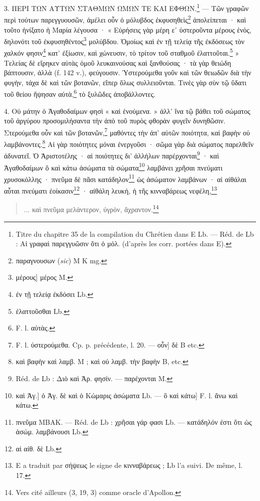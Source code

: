 \documentclass[landscape, a4paper, 11pt, oneside, polutonikogreek, french]{article}
\begin{document}
3. ΠΕΡΙ ΤΩΝ ΑΥΤΩΝ ΣΤΑΘΜΩΝ ΩΜΩΝ ΤΕ ΚΑΙ ΕΦΘΩΝ.\footnote{Titre du chapitre 35 de la compilation du Chrétien dans E Lb. --- Réd. de Lb : Αἱ γραφαὶ παρεγγυῶσιν ὅτι ὁ μόλ. (d'après les corr. portées dans E).} --- Τῶν γραφῶν περὶ τούτων παρεγγυουσῶν, ἀμέλει οὖν ὁ μόλυβδος ἐκφυσηθεὶς\footnote{παραγνουσων (\emph{sic}) M K mg.} ἀπολείπεται · καὶ τοῦτο ἠνίξατο ἡ Μαρία λέγουσα · « Εὑρήσεις γὰρ μέρη εʹ ὑστεροῦντα μέρους ἑνὸς, δηλονότι τοῦ ἐκφυσηθέντος\footnote{μέρους] μέρος M.} μολύβδου. Ὁμοίως καὶ ἐν τῇ τελείᾳ τῆς ἐκδόσεως τὸν χαλκόν φησιν\footnote{ἐν τῇ τελείᾳ ἐκδόσει Lb.} κατ' ἐξίωσιν, καὶ χώνευσιν, τὸ τρίτον τοῦ σταθμοῦ ἐλαττοῦται.\footnote{ἐλαττοῦσθαι Lb.} » Τελείας δὲ εἴρηκεν αὐτὰς ὁμοῦ λευκαινούσας καὶ ξανθούσας · τὰ γὰρ θειώδη βάπτουσιν, ἀλλὰ (f. 142 v.), φεύγουσιν. Ὑστερούμεθα γοῦν καὶ τῶν θειωδῶν διὰ τὴν φυγὴν, τάχα δὲ καὶ τῶν βοτανῶν, εἴπερ ὅλως συλλειοῦνται. Τινὲς γὰρ σὺν τῷ ὕδατι τοῦ θείου ἥψησαν αὐτὰ,\footnote{F. l. αὐτὰς.} τὸ ξυλῶδες ἀποβάλλοντες.

4. Οὐ μάτην ὁ Ἀγαθοδαίμων φησὶ « καὶ ἑνούμενα. » ἀλλ' ἵνα τῷ βάθει τοῦ σώματος τοῦ ἀργύρου προσομιλήσαντα τὴν ἀπὸ τοῦ πυρὸς φθορὰν φυγεῖν δυνηθῶσιν. Στερούμεθα οὖν καὶ τῶν βοτανῶν,\footnote{F. l. ὑστερούμεθα. Cp. p. précédente, l. 20. --- οὖν] δὲ B etc.} μαθόντες τὴν ἀπ' αὐτῶν ποιότητα, καὶ βαφὴν οὐ λαμβάνοντες.\footnote{καὶ βαφὴν καὶ λαμβ. M ; καὶ οὐ λαμβ. τὴν βαφὴν B, etc.} Αἱ γὰρ ποιότητες μόναι ἐνεργοῦσι · σῶμα γὰρ διὰ σώματος παρελθεῖν ἀδυνατεῖ. Ὁ Ἀριστοτέλης · αἱ ποιότητες δι' ἀλλήλων παρέρχονται\footnote{Réd. de Lb : Διὸ καὶ Ἀρ. φησίν. --- παρέχονται M.} · καὶ Ἀγαθοδαίμων ὃ καὶ κάτω ἀσώματα τὰ σώματα\footnote{καὶ Ἀγ.] ὁ Ἀγ. δὲ καὶ ὁ Κώμαρις ἀσώματα Lb. --- ὃ καὶ κάτω] F. l. ἄνω καὶ κάτω.} λαμβάνει χρῆσαι πνεύματι χρυσοκόλλης · πνεῦμα δὲ πᾶσι κατάδηλον\footnote{πνεῦμα MBAK. --- Réd. de Lb : χρῆσαι γάρ φασι Lb. --- κατάδηλόν ἐστι ὅτι ὡς ἀσώμ. λαμβάνουσι Lb.} ὡς ἀσώματον λαμβάνων · αἱ αἰθάλαι αὗται πνεύματι ἐοίκασιν\footnote{αἱ αἰθ. δὲ Lb.} · αἰθάλη λευκὴ, ἡ τῆς κινναβάρεως νεφέλη,\footnote{E a traduit par σήψεως le signe de κινναβάρεως ; Lb l'a suivi. De même, l. 17.}
\begin{quotation}
... καὶ πνεῦμα μελάντερον, ύγρὸν, ἄχραντον.\footnote{Vers cité ailleurs (3, 19, 3) comme oracle d'Apollon.}
\end{quotation}
\end{document}
